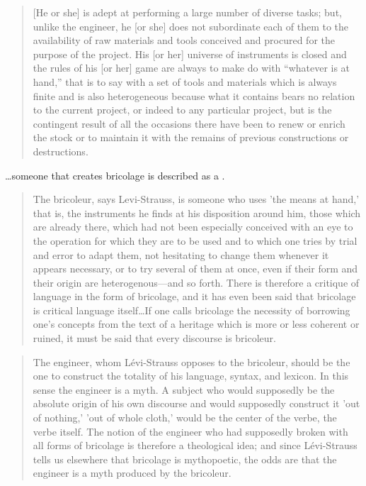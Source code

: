 \begin{quote}
[He or she] is adept at performing a large number of diverse tasks; but, unlike the engineer, he [or she] does not subordinate each of them to the availability of raw materials and tools conceived and procured for the purpose of the project. His [or her] universe of instruments is closed and the rules of his [or her] game are always to make do with “whatever is at hand,” that is to say with a set of tools and materials which is always finite and is also heterogeneous because what it contains bears no relation to the current project, or indeed to any particular project, but is the contingent result of all the occasions there have been to renew or enrich the stock or to maintain it with the remains of previous constructions or destructions.\cite{levi1966savage}
\end{quote}

\ldots someone that creates bricolage is described as a . 

\begin{quote}
The bricoleur, says Levi-Strauss, is someone who uses 'the means at hand,' that is, the instruments he finds at his disposition around him, those which are already there, which had not been especially conceived with an eye to the operation for which they are to be used and to which one tries by trial and error to adapt them, not hesitating to change them whenever it appears necessary, or to try several of them at once, even if their form and their origin are heterogenous---and so forth. There is therefore a critique of language in the form of bricolage, and it has even been said that bricolage is critical language itself\ldots If one calls bricolage the necessity of borrowing one's concepts from the text of a heritage which is more or less coherent or ruined, it must be said that every discourse is bricoleur.\cite{derrida1993structure}
\end{quote}

\begin{quote}
The engineer, whom Lévi-Strauss opposes to the bricoleur, should be the one to construct the totality of his language, syntax, and lexicon. In this sense the engineer is a myth. A subject who would supposedly be the absolute origin of his own discourse and would supposedly construct it 'out of nothing,' 'out of whole cloth,' would be the center of the verbe, the verbe itself. The notion of the engineer who had supposedly broken with all forms of bricolage is therefore a theological idea; and since Lévi-Strauss tells us elsewhere that bricolage is mythopoetic, the odds are that the engineer is a myth produced by the bricoleur.\cite{derrida1993structure}
\end{quote}

